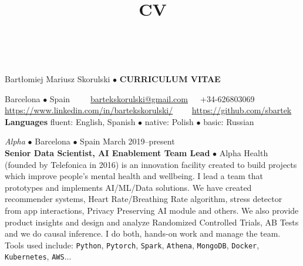 \documentclass[a4paper, oneside]{scrreprt}
\title{CV}
\author{}
\date{}
\begin{document}
\ \\

\vspace{1cm}

\noindent Bartłomiej Mariusz Skorulski $\bullet$ \textbf{CURRICULUM VITAE}

\vspace{-0.3cm}
\noindent\makebox[\linewidth]{\rule{\textwidth}{0.4pt}}

\noindent\llap{\FA \faHome\ \ } Barcelona $\bullet$ Spain\ \
{\FA \faEnvelope\ \ }\ \href{mailto:bartekskorulski@gmail.com}{bartekskorulski@gmail.com}\ \ 
{\FA \faMobilePhone}\  +34-626803069\\
\noindent\llap{\FA \faLinkedin\ \ } 
\href{https://www.linkedin.com/in/bartekskorulski/}{https://www.linkedin.com/in/bartekskorulski/}\ \ 
{\FA \faGithub\ \ } \href{https://github.com/sbartek}{https://github.com/sbartek}\\
\noindent\llap{\FA \faComments\ \ } \textbf{Languages} 
fluent: English, Spanish $\bullet$ native: Polish  $\bullet$ basic: Russian 

\vspace{-0.3cm}

\noindent\makebox[\linewidth]{\rule{\textwidth}{0.4pt}}


\noindent{}
\hspace{-0.15cm}\textit{Alpha} $\bullet$
Barcelona $\bullet$ Spain \hfill March 2019--present\\
\noindent\textbf{\small Senior Data Scientist, AI Enablement Team Lead} $\bullet$ 
{\small Alpha Health (founded by Telefonica in 2016) is an innovation facility created to build
  projects which improve people's mental health and wellbeing.  I lead a team that prototypes and
  implements AI/ML/Data solutions. We have created recommender systems, Heart Rate/Breathing Rate
  algorithm, stress detector from app interactions, Privacy Preserving AI module and others. We also
  provide product insights and design and analyze Randomized Controlled Trials, AB Tests and we do
  causal inference. I do both, hands-on work and manage the team.  Tools used include:
  \texttt{Python}, \texttt{Pytorch}, \texttt{Spark}, \texttt{Athena}, \texttt{MongoDB},
  \texttt{Docker}, \texttt{Kubernetes}, \texttt{AWS}... }\\
\end{document}
